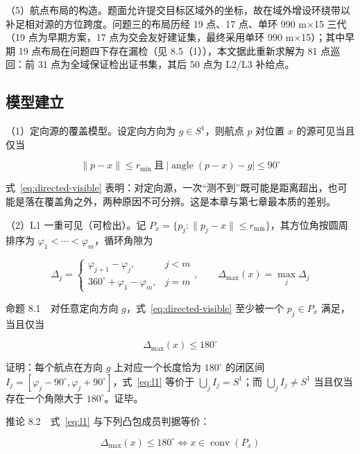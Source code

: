\documentclass[12pt,a4paper]{ctexart}
\begin{document}
（5）航点布局的构造。题面允许提交目标区域外的坐标，故在域外增设环绕带以补足相对源的方位跨度。问题三的布局历经 19 点、17 点、单环 990 m$\times$15 三代（19 点为早期方案，17 点为交会友好建证集，最终采用单环 990 m$\times$15）；其中早期 19 点布局在问题四下存在漏检（见 8.5（1）），本文据此重新求解为 81 点巡回：前 31 点为全域保证检出证书集，其后 50 点为 L2/L3 补给点。

\subsection{模型建立}

（1）定向源的覆盖模型。设定向方向为 $g\in S^1$，则航点 $p$ 对位置 $x$ 的源可见当且仅当

\begin{equation}
	\|p-x\|\le r_{\min}\ \text{且}\ |\operatorname{angle}(p-x)-g|\le90^\circ
	\label{eq:directed-visible}
\end{equation}

式~\eqref{eq:directed-visible} 表明：对定向源，一次“测不到”既可能是距离超出，也可能是落在覆盖角之外，两种原因不可分辨。这是本章与第七章最本质的差别。

（2）L1 一重可见（可检出）。记 $P_x=\{p_j:\|p_j-x\|\le r_{\min}\}$，其方位角按圆周排序为 $\varphi_1<\cdots<\varphi_m$，循环角隙为

\begin{equation}
	\Delta_j=\begin{cases}\varphi_{j+1}-\varphi_j,&j<m\\360^\circ+\varphi_1-\varphi_m,&j=m\end{cases},\qquad\Delta_{\max}(x)=\max_j\Delta_j
	\label{eq:gap}
\end{equation}

命题 8.1　对任意定向方向 $g$，式~\eqref{eq:directed-visible} 至少被一个 $p_j\in P_x$ 满足，当且仅当

\begin{equation}
	\Delta_{\max}(x)\le180^\circ
	\label{eq:l1}
\end{equation}

证明：每个航点在方向 $g$ 上对应一个长度恰为 $180^\circ$ 的闭区间 $I_j=[\varphi_j-90^\circ,\varphi_j+90^\circ]$，式~\eqref{eq:l1} 等价于 $\bigcup_jI_j=S^1$；而 $\bigcup_jI_j\neq S^1$ 当且仅当存在一个角隙大于 $180^\circ$。证毕。

推论 8.2　式~\eqref{eq:l1} 与下列凸包成员判据等价：

\begin{equation}
	\Delta_{\max}(x)\le180^\circ\iff x\in\operatorname{conv}(P_x)
	\label{eq:convexhull}
\end{equation}
\end{document}
